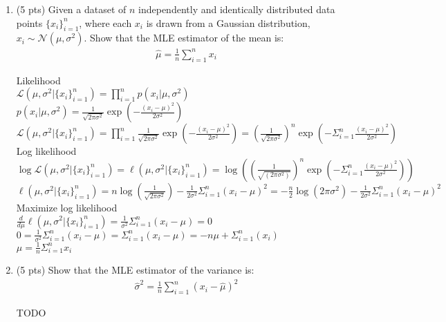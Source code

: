 \documentclass[11pt]{article}
\begin{document}
\begin{enumerate}
\item (5 pts) Given a dataset of 
$n$ independently and identically distributed data points $\{x_i\}_{i=1}^n$, where each $x_i$ is drawn from a Gaussian distribution, $x_i\sim \mathcal{N}(\mu, \sigma^2)$. Show that the MLE estimator of the mean is:
\begin{align}
& \hat{\mu}=\frac{1}{n} \sum_{i=1}^n x_i 
\end{align}
\begin{answertext}{9cm}{}

Likelihood\\
$\mathcal{L}(\mu, \sigma^2 | \{x_i\}_{i=1}^{n}) = \prod_{i=1}^{n} p(x_i | \mu, \sigma^2)$\\
$p(x_i | \mu, \sigma^2) = \frac{1}{\sqrt{2\pi\sigma^2}} \exp({-\frac{(x_i-\mu)^2}{2\sigma^2}})$\\
$\mathcal{L}(\mu, \sigma^2 | \{x_i\}_{i=1}^{n}) = \prod_{i=1}^{n} \frac{1}{\sqrt{2\pi\sigma^2}} \exp({-\frac{(x_i-\mu)^2}{2\sigma^2}}) = (\frac{1}{\sqrt{2\pi\sigma^2}})^n \exp(-\Sigma_{i=1}^{n}\frac{(x_i-\mu)^2}{2\sigma^2})$\\

Log likelihood\\
$\log{\mathcal{L}(\mu, \sigma^2 | \{x_i\}_{i=1}^{n})} = \ell(\mu, \sigma^2 | \{x_i\}_{i=1}^{n}) = \log((\frac{1}{\sqrt{(2\pi\sigma^2)}})^n \exp(-\Sigma_{i=1}^{n}\frac{(x_i-\mu)^2}{2\sigma^2}))$\\
$\ell(\mu, \sigma^2 | \{x_i\}_{i=1}^{n}) = n\log(\frac{1}{\sqrt{2\pi\sigma^2}}) - \frac{1}{2\sigma^2} \Sigma_{i=1}^{n}(x_i-\mu)^2 = -\frac{n}{2}\log(2\pi\sigma^2) - \frac{1}{2\sigma^2}\Sigma_{i=1}^{n}(x_i-\mu)^2$\\

Maximize log likelihood\\
$\frac{d}{d\mu} \ell(\mu, \sigma^2 | \{x_i\}_{i=1}^{n}) = \frac{1}{\sigma^2}\Sigma_{i=1}^{n}(x_i-\mu) = 0$\\
$0 = \frac{1}{\sigma^2}\Sigma_{i=1}^{n}(x_i-\mu) = \Sigma_{i=1}^{n}(x_i-\mu) = -n\mu + \Sigma_{i=1}^{n}(x_i)$\\
$\mu = \frac{1}{n}\Sigma_{i=1}^{n}x_i$

\end{answertext} 
\newpage
\item (5 pts) Show that the MLE estimator of the variance is: 
\begin{align}
& \hat{\sigma}^2=\frac{1}{n} \sum_{i=1}^n\left(x_i-\widehat{\mu}\right)^2
\end{align}
\begin{answertext}{9cm}{}

TODO

\end{answertext}

\end{enumerate}
\end{document}
